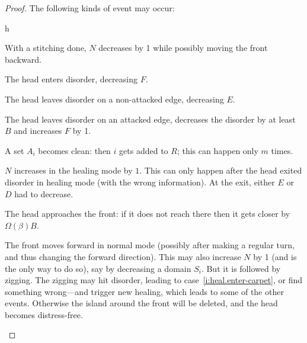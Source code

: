 \documentclass[11pt]{memoir}
\theoremstyle{definition} %
\def\B{B}
\begin{document}
\begin{proof}
The following kinds of event may occur:
\begin{varenum}{h}

\item\label{i:heal.N-decr} With a stitching done, \( N \) decreases by 1 while possibly 
moving the front backward.

\item\label{i:heal.enter-carpet} The head enters disorder, decreasing \( F \).

\item\label{i:heal.leave-carpet.E}
The head leaves disorder on a non-attacked edge, decreasing \( E \).

\item\label{i:heal.leave-carpet.F}
The head leaves disorder on an attacked edge, decreases the disorder by at least \( \B \) and
increases \( F \) by 1.


\item\label{i:heal.clean}
A set \( A_{i} \) becomes clean: then \( i \) gets added to \( R \); 
this can happen only \( m \) times.

\item\label{i:heal.N-incr.healing}
\( N \) increases in the healing mode by \( 1 \).
This can only happen after the head exited disorder in healing mode (with the wrong information).
At the exit, either \( E \) or \( D \) had to decrease.

\item\label{i:heal.approach-front} 
The head approaches the front: if it does not reach there then it gets closer by  
 \( \Omega(\beta)\B \).

\item\label{i:heal.front-move} The front moves forward in normal mode
(possibly after making a regular turn, and thus changing the forward direction).
This may also increase \( N \) by 1 (and is the only way to do so), 
say by decreasing a domain \( S_{i} \).
But it is followed by zigging.
The zigging may hit disorder, leading to case~\eqref{i:heal.enter-carpet},
or find something wrong---and trigger new healing, which leads to some of the other events.
Otherwise the island around the front will be deleted, and the head becomes distress-free.
\end{varenum}


\end{proof}
\end{document}
